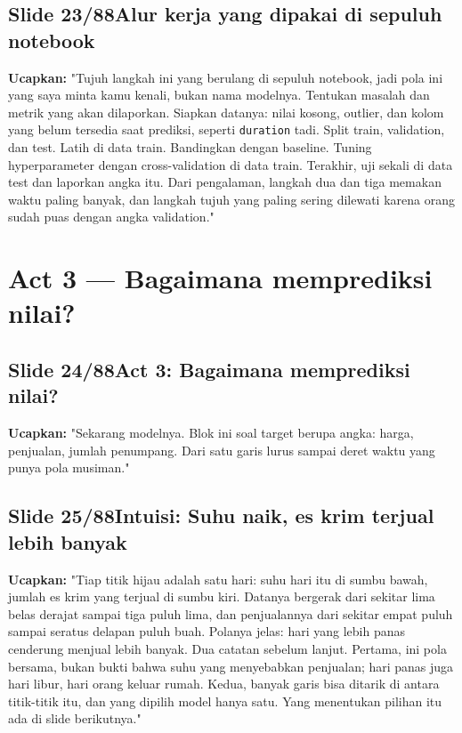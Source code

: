 \documentclass[11pt]{article}
\renewcommand{\framebox}[1]{\colorbox{acc!15}{\textcolor{acc}{\textbf{#1}}}}
\begin{document}
\subsection*{\framebox{Slide 23/88}\quad Alur kerja yang dipakai di sepuluh notebook}
\textbf{Ucapkan:} "Tujuh langkah ini yang berulang di sepuluh notebook, jadi pola ini yang saya minta kamu kenali, bukan nama modelnya. Tentukan masalah dan metrik yang akan dilaporkan. Siapkan datanya: nilai kosong, outlier, dan kolom yang belum tersedia saat prediksi, seperti \texttt{duration} tadi. Split train, validation, dan test. Latih di data train. Bandingkan dengan baseline. Tuning hyperparameter dengan cross-validation di data train. Terakhir, uji sekali di data test dan laporkan angka itu. Dari pengalaman, langkah dua dan tiga memakan waktu paling banyak, dan langkah tujuh yang paling sering dilewati karena orang sudah puas dengan angka validation."\\[2pt]

\section{Act 3 — Bagaimana memprediksi nilai?}

\subsection*{\framebox{Slide 24/88}\quad Act 3: Bagaimana memprediksi nilai?}
\textbf{Ucapkan:} "Sekarang modelnya. Blok ini soal target berupa angka: harga, penjualan, jumlah penumpang. Dari satu garis lurus sampai deret waktu yang punya pola musiman."\\[2pt]

\subsection*{\framebox{Slide 25/88}\quad Intuisi: Suhu naik, es krim terjual lebih banyak}
\textbf{Ucapkan:} "Tiap titik hijau adalah satu hari: suhu hari itu di sumbu bawah, jumlah es krim yang terjual di sumbu kiri. Datanya bergerak dari sekitar lima belas derajat sampai tiga puluh lima, dan penjualannya dari sekitar empat puluh sampai seratus delapan puluh buah. Polanya jelas: hari yang lebih panas cenderung menjual lebih banyak. Dua catatan sebelum lanjut. Pertama, ini pola bersama, bukan bukti bahwa suhu yang menyebabkan penjualan; hari panas juga hari libur, hari orang keluar rumah. Kedua, banyak garis bisa ditarik di antara titik-titik itu, dan yang dipilih model hanya satu. Yang menentukan pilihan itu ada di slide berikutnya."\\[2pt]
\end{document}

